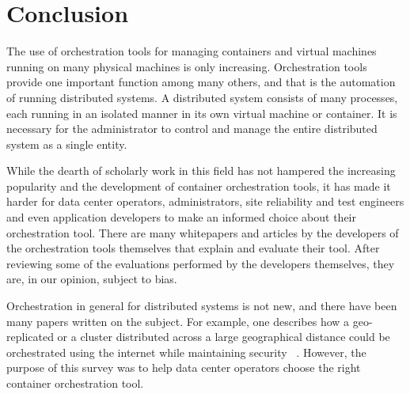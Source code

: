\documentclass[10pt,twocolumn]{article}
\begin{document}
\section{Conclusion}

The use of orchestration tools for managing containers and virtual machines running on many physical machines is only increasing.
Orchestration tools provide one important function among many others, and that is the automation of running distributed systems.
A distributed system consists of many processes, each running in an isolated manner in its own virtual machine or container.
It is necessary for the administrator to control and manage the entire distributed system as a single entity.

While the dearth of scholarly work in this field has not hampered the increasing popularity and the development of container orchestration tools, it has made it harder for data center operators, administrators, site reliability and test engineers and even application developers to make an informed choice about their orchestration tool.
There are many whitepapers and articles by the developers of the orchestration tools themselves that explain and evaluate their tool.
After reviewing some of the evaluations performed by the developers themselves, they are, in our opinion, subject to bias.

Orchestration in general for distributed systems is not new, and there have been many papers written on the subject.
For example, one describes how a geo-replicated or a cluster distributed across a large geographical distance could be orchestrated using the internet while maintaining security ~\cite{intro_orchestration}.
However, the purpose of this survey was to help data center operators choose the right container orchestration tool.



\end{document}
